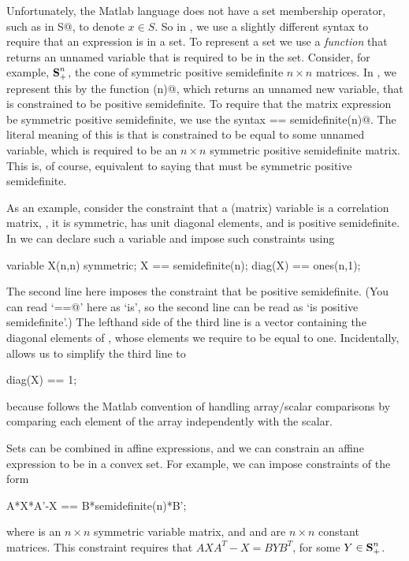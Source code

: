 \documentclass[12pt]{article}
\newcommand{\symm}{{\mbox{\bf S}}}  %
\begin{document}
Unfortunately, the Matlab language does not have a 
set membership operator, such as \verb@x in S@, to denote $x \in S$.  
So in \cvx, we use a slightly different syntax to require
that an expression is in a set.
To represent a set we use a \emph{function} that returns
an unnamed variable that is required to be in the set.
Consider, for example, $\symm^n_+$, the cone of 
symmetric positive semidefinite $n \times n$ matrices.
In \cvx, we represent this by the function \verb@semidefinite(n)@,
which returns an unnamed new variable, that is constrained to be
positive semidefinite.
To require that the matrix expression \verb@X@ 
be symmetric positive semidefinite, we use the syntax \verb@X == semidefinite(n)@.
The literal meaning of this is that \verb@X@ is constrained to be 
equal to some unnamed variable, which is required to be 
an $n \times n$ symmetric positive semidefinite matrix. 
This is, of course, equivalent to saying that \verb@X@ must be
symmetric positive semidefinite.

As an example, consider the constraint
that a (matrix) variable \verb@X@ is a correlation
matrix, \ie, it is symmetric, has unit diagonal elements, and 
is positive semidefinite.  In \cvx we can declare such a variable
and impose such constraints using
\begin{code}
	variable X(n,n) symmetric;
	X == semidefinite(n);
	diag(X) == ones(n,1);
\end{code}
The second line here imposes the constraint that \verb@X@
be positive semidefinite.
(You can read `\verb@==@' here as `is', so the second line can be 
read as `\verb@X@ is positive semidefinite'.)
The lefthand side of the third line
is a vector containing the diagonal elements of \verb@X@, whose 
elements we require to be equal to one. Incidentally, \cvx
allows us to simplify the third line to
\begin{code}
	diag(X) == 1;
\end{code}
because \cvx follows the Matlab convention of handling array/scalar
comparisons by comparing each element of the array independently with the scalar.

Sets can be combined in affine expressions, and we can constrain
an affine expression to be in a convex set.
For example, we can impose constraints of the form
\begin{code}
	A*X*A'-X == B*semidefinite(n)*B';
\end{code}
where \verb@X@ is an $n \times n$ symmetric variable matrix,
and \verb@A@ and \verb@B@ are $n \times n$  constant matrices.
This constraint requires that $AXA^T-X=BYB^T$, 
for some $Y \in \symm^n_+$.
\end{document}
